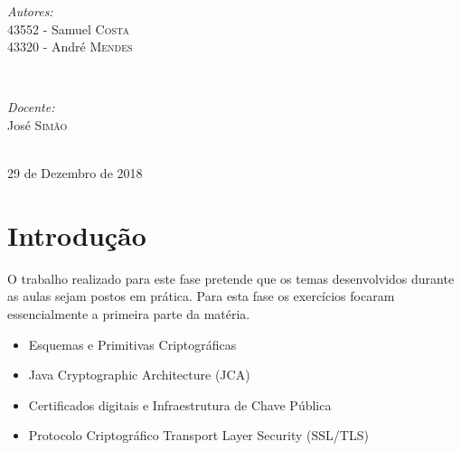\documentclass[11pt]{report}
\begin{document}
\begin{titlepage}
\vskip 70pt
\begin{minipage}{0.4\textwidth}
\begin{flushleft} \large
\emph{Autores:}\\
43552 - Samuel \textsc{Costa}\\
43320 - André \textsc{Mendes}
\end{flushleft}
\end{minipage}
~
\begin{minipage}{0.4\textwidth}
\begin{flushright} \large
\emph{Docente:} \\
José \textsc{Simão}\\
\end{flushright}
\end{minipage}\\[3cm]


{\large 29 de Dezembro de 2018}\\[3cm] %


\vfill %

\end{titlepage}


\renewcommand\thesection{\arabic{section}}

\tableofcontents


\newpage


\section{Introdução}
O trabalho realizado para este fase pretende que os temas desenvolvidos durante as aulas sejam postos em prática. Para esta fase os exercícios focaram essencialmente a primeira parte da matéria.\\

\begin{itemize}
  \item Esquemas e Primitivas Criptográficas
  \item Java Cryptographic Architecture (JCA)
  \item Certificados digitais e Infraestrutura de Chave Pública
  \item Protocolo Criptográfico Transport Layer Security (SSL/TLS)
\end{itemize}
\end{document}
